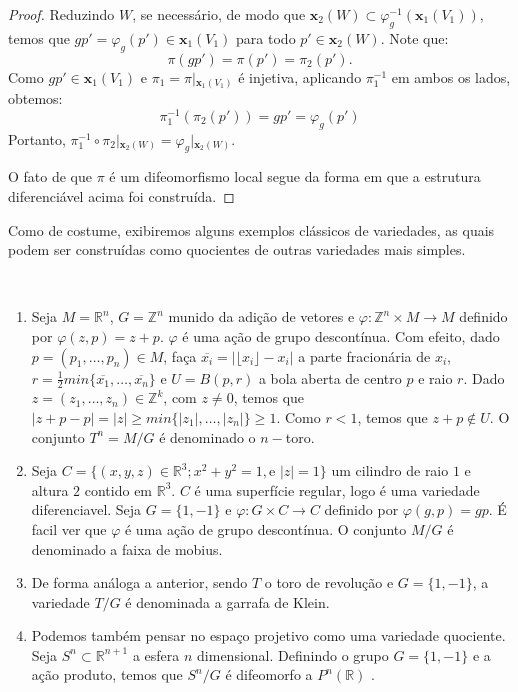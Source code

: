 \begin{proposition}
\begin{proof}
			Reduzindo $W$, se necessário, de modo que $\mathbf{x}_2(W) \subset \varphi_g^{-1}(\mathbf{x}_1(V_1))$, temos que $g p' = \varphi_g(p') \in \mathbf{x}_1(V_1)$ para todo $p' \in \mathbf{x}_2(W)$.
			Note que:
			\begin{equation*}
				\pi(g p') = \pi(p') = \pi_2(p').
			\end{equation*}
			Como $g p' \in \mathbf{x}_1(V_1)$ e $\pi_1 = \pi\vert{}_{\mathbf{x}_1(V_1)}$ é injetiva, aplicando $\pi_1^{-1}$ em ambos os lados, obtemos:
			\begin{equation*}
				\pi_1^{-1}(\pi_2(p')) = g p' = \varphi_g(p')
			\end{equation*}
			Portanto, $\pi_1^{-1} \circ \pi_2\vert{}_{\mathbf{x}_2(W)} = \varphi_g\vert{}_{\mathbf{x}_2(W)}$.

			O fato de que $\pi$ é um difeomorfismo local segue da forma em que a estrutura diferenciável acima foi construída.
		\end{proof}
	\end{proposition}
	Como de costume, exibiremos alguns exemplos clássicos de variedades, as quais podem ser construídas como quocientes de outras variedades mais simples.
	\begin{examples}
		\label{ex:variedades-quocientes}
		$ $
		\begin{enumerate}
			\item Seja $M=\mathbb{R}^{n}$, $G=\mathbb{Z}^{n}$ munido da adição de vetores e $\varphi:\mathbb{Z}^{n}\times M\to M$ definido por $\varphi(z, p)=z+p$. $\varphi$ é uma ação de grupo descontínua. Com efeito, dado $p=(p_{1}, \dots, p_{n}) \in M$, faça $\overline{x_{i}}=|\lfloor x_{i} \rfloor-x_{i}|$ a parte fracionária de $x_{i}$,  $r=\frac{1}{2}min\{ \overline{x_{1}}, \dots, \overline{x_{n}}\}$ e $U=B(p, r)$ a bola aberta de centro $p$ e raio $r$. Dado $z =(z_{1}, \dots, z_{n})\in \mathbb{Z}^{k}$, com $z\neq0$, temos que $|z+p-p|=|z|\geq min\{ |z_{1}|, \dots, |z_{n}| \}\geq1$. Como $r<1$, temos que $z+p\not\in U$. O conjunto $T^{n}=M/G$ é denominado o $n-$toro.
			\item Seja $C=\{(x, y, z) \in \mathbb{R}^{3}; x^{2}+y^{2}=1, \text{e }|z|=1 \}$ um cilindro de raio $1$ e altura $2$ contido em $\mathbb{R}^{3}$. $C$ é uma superfície regular, logo é uma variedade diferenciavel. Seja $G=\{ 1, -1 \}$ e $\varphi:G\times C\to C$ definido por $\varphi(g, p)=gp$. É facil ver que $\varphi$ é uma ação de grupo descontínua. O conjunto $M/G$ é denominado a faixa de mobius.
			\item De forma análoga a anterior, sendo $T$ o toro de revolução e $G=\{ 1, -1 \}$, a variedade $T/G$ é denominada a garrafa de Klein.
			\item Podemos também pensar no espaço projetivo como uma variedade quociente. Seja $S^{n}\subset \mathbb{R}^{n+1}$ a esfera $n$ dimensional. Definindo o grupo $G=\{ 1, -1 \}$ e a ação produto, temos que $S^{n}/G$ é difeomorfo a $P^{n}(\mathbb{R})$ \cite{doCarmo1992}.
		\end{enumerate}
	\end{examples}
\fi


